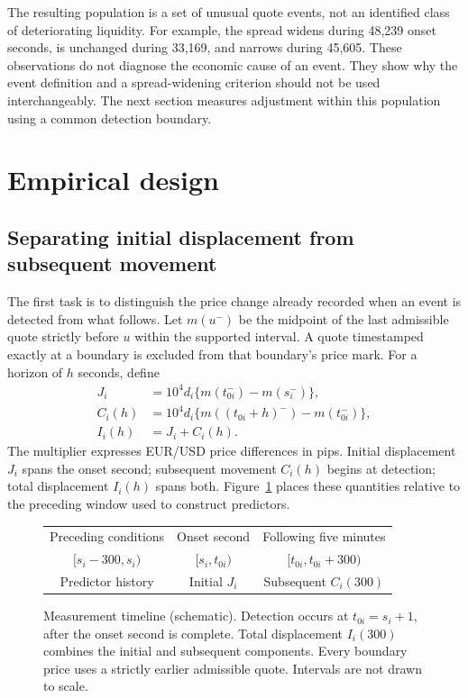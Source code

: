 \documentclass[12pt,letterpaper]{article}
\begin{document}
The resulting population is a set of unusual quote events, not an identified class of deteriorating liquidity. For example, the spread widens during 48,239 onset seconds, is unchanged during 33,169, and narrows during 45,605. These observations do not diagnose the economic cause of an event. They show why the event definition and a spread-widening criterion should not be used interchangeably. The next section measures adjustment within this population using a common detection boundary.

\section{Empirical design}\label{sec:design}
\subsection{Separating initial displacement from subsequent movement}
The first task is to distinguish the price change already recorded when an event is detected from what follows. Let $m(u^-)$ be the midpoint of the last admissible quote strictly before $u$ within the supported interval. A quote timestamped exactly at a boundary is excluded from that boundary's price mark. For a horizon of $h$ seconds, define
\begin{equation}\begin{aligned}
J_i&=10^4d_i\{m(t_{0i}^-)-m(s_i^-)\},\\
C_i(h)&=10^4d_i\{m((t_{0i}+h)^-)-m(t_{0i}^-)\},\\
I_i(h)&=J_i+C_i(h).
\end{aligned}\label{eq:decomposition}\end{equation}
The multiplier expresses EUR/USD price differences in pips. Initial displacement $J_i$ spans the onset second; subsequent movement $C_i(h)$ begins at detection; total displacement $I_i(h)$ spans both. Figure~\ref{fig:timeline} places these quantities relative to the preceding window used to construct predictors.

\begin{figure}[!ht]\centering
\begin{tabular}{ccc}\toprule
Preceding conditions & Onset second & Following five minutes\\
$[s_i-300,s_i)$ & $[s_i,t_{0i})$ & $[t_{0i},t_{0i}+300)$\\
Predictor history & Initial $J_i$ & Subsequent $C_i(300)$\\\bottomrule
\end{tabular}
\caption{Measurement timeline (schematic). Detection occurs at $t_{0i}=s_i+1$, after the onset second is complete. Total displacement $I_i(300)$ combines the initial and subsequent components. Every boundary price uses a strictly earlier admissible quote. Intervals are not drawn to scale.}\label{fig:timeline}
\end{figure}
\FloatBarrier
\end{document}
